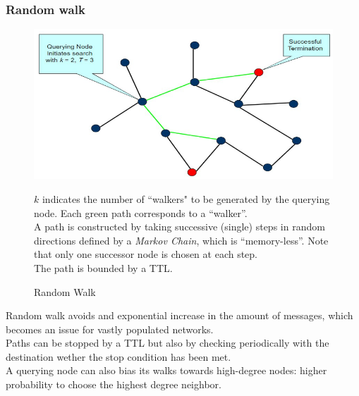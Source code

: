 \subsubsection{Random walk}

\begin{figure}[htbp]
   \centering
   \includegraphics{images/randomwalk.png}
   \caption{Random Walk}
   \label{fig:randomwalk}
   $k$ indicates the number of ``walkers" to be generated by the querying node. Each green path corresponds to a ``walker''.\\
   A path is constructed by taking successive (single) steps in random directions defined by a \textit{Markov Chain}, which is ``memory-less''.
   Note that only one successor node is chosen at each step.\\
   The path is bounded by a TTL.
\end{figure}
Random walk avoids and exponential increase in the amount of messages, which becomes an issue for vastly populated networks.\\
Paths can be stopped by a TTL but also by checking periodically with the destination wether the stop condition has been met.\\
A querying node can also bias its walks towards high-degree nodes: higher probability to choose the highest degree neighbor.


